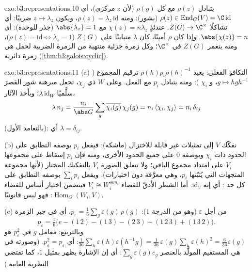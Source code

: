 \begin{solution}{exo:b3:representations:10}
يتبادل $\rho(z)$ مع كل $\rho(g)$ (لأن $z$ مركزي)، أي $\rho(z) \in \operatorname{End}_G(V) = \C\,\mathrm{id}$
(بشور): ومنه $\rho(z) = \lambda_z\,\mathrm{id}$، ويكون $z \mapsto \lambda_z$ ضربيًا: أي تشاكلًا $Z(G) \to \C^\times$.
عندئذٍ $\chi(z) = n\lambda_z$ مع $\abs{\lambda_z} = 1$ (جذر للوحدة): أي $\abs{\chi(z)} = n$. وإذا كان
$\rho$ أمينًا، كان $\lambda$ متباينًا على $Z(G)$ ($\rho(z) = \mathrm{id} \iff \lambda_z =
1$)، ومنه
ينغمر $Z(G)$ في $\C^\times$؛ وكل زمرة جزئية منتهية من الزمرة
الضربية لحقل هي زمرة دائرية (\cref{thm:b3:galois:cyclic}).
\end{solution}

\begin{solution}{exo:b3:representations:11}
(a) التكافؤ الفعلي: يعيد $\rho(h)p_i\rho(h)^{-1}$ ترقيم المجموع ($g \mapsto hgh^{-1}$، و
$\chi_i$ ): ومنه يتبادل $p_i$ مع الفعل. وعلى  $W$ ذي  $\chi_j$، تجعل مبرهنة شور
القصرَ سلَّميًا $\lambda\,\mathrm{id}_W$؛ وبأخذ الآثار،
\[
\lambda\,n_j = \frac{n_i}{\abs G}\sum_g
\overline{\chi_i(g)}\,\chi_j(g) = n_i\,\langle\chi_i,
\chi_j\rangle = n_i\,\delta_{ij}
\]
(بالتعامد الأول): أي $\lambda = \delta_{ij}$.

(b) نفكّك $V$ إلى تمثيلات غير قابلة للاختزال (ماشكه): فيفعل
$p_i$ بوصفه التطابق على الحدود ذات  $\chi_i$ وبوصفه $0$
على جميع الحدود الأخرى، ومنه فإن $p_i$ إسقاط على مجموعها $V_i$
على امتداد مجموع الباقي؛ ولا تتعلق الصورة $V_i$ بالتفكيك
المختار (لأنها مجموعة المتجهات التي يُثبّتها $p_i$، وهي معرَّفة
دون اختيارات). ويفعل $\sum_ip_i$ بوصفه التطابق على كل حد : أي إنه $\mathrm{id}_V$. أما الشطر الأدقّ للفضاء $V_i \cong W_i^{\oplus m_i}$
فيتضمن اختيار أساس للفضاء $\operatorname{Hom}_G(W_i, V)$: فهو ليس قانونيًا.

(c) من أجل $\varepsilon$ (وهو من الدرجة $1$): $p_\varepsilon =
\frac1{6}\sum_{g}\varepsilon(g)\,\rho(g)$، أي في
جبر الزمرة
\[
p_\varepsilon = \tfrac16\bigl(e - (1\,2) - (1\,3) - (2\,3)
+ (1\,2\,3) + (1\,3\,2)\bigr) .
\]
وبالتربيع: معامل $g$ في $p_\varepsilon^2$ هو $\frac1{36}\sum_{h}\varepsilon(h)\varepsilon(h^{-1}g) =
\frac1{36}\,\varepsilon(g)\sum_h\varepsilon(h)^2 =
\frac{6}{36}\varepsilon(g)$: أي $p_\varepsilon^2 =
p_\varepsilon$. (وصورته
في  هي المستقيم المولَّد بالعنصر $\sum_g\varepsilon(g)e_g$: أي إن
 الإشارة يظهر بمثيل $1$، كما تقتضي النظرية العامة.)
\end{solution}

